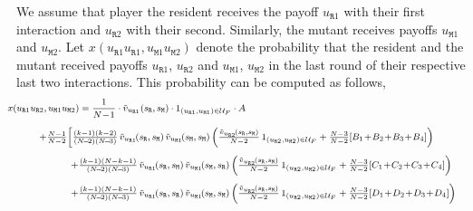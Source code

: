\documentclass[11pt]{article}
\def\resident{\texttt{R}}
\def\mutant{\texttt{M}}
\def\strategy{s}
\theoremstyle{plainCl1}
\theoremstyle{plainCl2}
\begin{document}

We assume that player the resident receives the payoff \(u_{\resident1}\) with their first interaction and \(u_{\resident 2}\) with their second.
Similarly, the mutant receives payoffs \(u_{\mutant 1}\) and \(u_{\mutant 2}\). 
Let \(x(u_{\resident1} u_{\resident1}, u_{\mutant 1} u_{\mutant 2})\) denote the probability that the resident and the mutant received payoffs  \(u_{\resident1}\), \(u_{\resident2}\) and \(u_{\mutant 1}\), \(u_{\mutant 2}\) in the last round of their respective last two interactions.
This probability can be computed as follows, 
\begin{equation} \label{Eq:xTwoInteractions} 
  \setlength{\arraycolsep}{0.5cm}
  \footnotesize
  \hspace*{-0.8cm} 
  \begin{array}{lll}
  \multicolumn{3}{l}{x(u_{\resident1}u_{\resident 2}, u_{\mutant 1}u_{\mutant 2})= \displaystyle \frac{1}{N\!-\!1}\cdot \tilde{v}_{u_{\resident1}}(\strategy_\resident,\strategy_\mutant)\cdot 1_{(u_{\resident1},u_{\mutant 1})\in \mathcal{U}_F} \cdot A }\\[0.4cm]
  
  &\multicolumn{2}{l}{+ \frac{N-1}{N-2} \biggl[
  \frac{(k - 1)(k - 2)}{(N\!-\!2)(N\!-\!3)}\,
  \tilde{v}_{u_{\resident1}}\!(\strategy_\resident,\strategy_\mutant) \, \tilde{v}_{u_{\mutant 1}}\!(\strategy_\mutant,\strategy_\mutant) 
  \left( \frac{\tilde{v}_{u_{\resident 2}}\!(\strategy_\resident,\strategy_\mutant)}{N-2} \, 1_{(u_{\resident 2},u_{\mutant 2})\in \mathcal{U}_F} +\frac{N-3}{N-2} [B_1 \!+\! B_2 \!+\! B_3 \!+\! B_4]\right)}\\[0.4cm] 

  &&+ \frac{\left(k - 1\right) \left(N - k - 1\right)}{(N\!-\!2)(N\!-\!3)}\,
  \tilde{v}_{u_{\resident1}}\!(\strategy_\resident,\strategy_\mutant) \, \tilde{v}_{u_{\mutant 1}}\!(\strategy_\mutant,\strategy_\resident)  
  \left(\frac{\tilde{v}_{u_{\resident 2}}\!(\strategy_\resident,\strategy_\mutant)}{N-2} \, 1_{(u_{\resident 2},u_{\mutant 2})\in \mathcal{U}_F} + \frac{N-3}{N-2} [C_1 \!+\! C_2 \!+\! C_3 \!+\! C_4]\right) \\[0.4cm] 
  
  &&+ \frac{\left(k - 1\right) \left(N - k - 1\right)}{(N\!-\!2)(N\!-\!3)} \,
  \tilde{v}_{u_{\resident1}}\!(\strategy_\resident,\strategy_\resident) \, \tilde{v}_{u_{\mutant 1}}\!(\strategy_\mutant,\strategy_\mutant)  
  \left(\frac{\tilde{v}_{u_{\resident 2}}\!(\strategy_\resident,\strategy_\mutant)}{N-2} \, 1_{(u_{\resident 2},u_{\mutant 2})\in \mathcal{U}_F} + \frac{N-3}{N-2} [D_1 \!+\! D_2 \!+\! D_3 \!+\! D_4]\right) \\[0.4cm] 
  

\end{array}
\end{equation}
\end{document}
